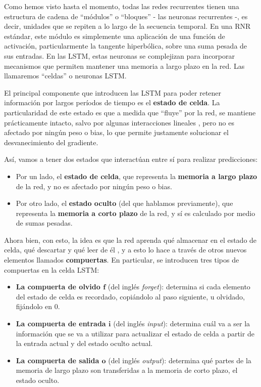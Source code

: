 \documentclass[../../main.tex]{subfiles}
\begin{document}
Como hemos visto hasta el momento, todas las redes recurrentes tienen una estructura de
cadena de ``módulos'' o ``bloques'' \cite{colahs-blog-lstm-2015} - las neuronas
recurrentes -, es decir, unidades que se repiten a lo largo de la secuencia temporal. En
una RNR estándar, este módulo es simplemente una aplicación de una función de activación,
particularmente la tangente hiperbólica, sobre una suma pesada de sus entradas. En las
LSTM, estas neuronas se complejizan para incorporar mecanismos que permiten mantener
una memoria a largo plazo en la red. Las llamaremos ``celdas'' o neuronas LSTM.

El principal componente que introducen las LSTM para poder retener información por largos
períodos de tiempo es el \textbf{estado de celda}. La particularidad de este estado es que
a medida que ``fluye'' por la red, se mantiene prácticamente intacto, salvo por algunas
interacciones lineales \cite{colahs-blog-lstm-2015}, pero no es afectado por ningún peso o
bias, lo que permite justamente solucionar el desvanecimiento del gradiente.

Así, vamos a tener dos estados que interactúan entre sí para realizar predicciones:
\begin{itemize}
    \item Por un lado, el \textbf{estado de celda}, que representa la \textbf{memoria a largo
    plazo} de la red, y no es afectado por ningún peso o bias.
    \item Por otro lado, el \textbf{estado oculto} (del que hablamos previamente), que
    representa la \textbf{memoria a corto plazo} de la red, y sí es calculado por medio
    de sumas pesadas.
\end{itemize}

Ahora bien, con esto, la idea es que la red aprenda qué almacenar en el estado de celda,
qué descartar y qué leer de él \cite{hands-on-ML-sklearn-tf}, y a esto lo hace a través de
otros nuevos elementos llamados \textbf{compuertas}. En particular, se introducen tres
tipos de compuertas en la celda LSTM:
\begin{itemize}
    \item \textbf{La compuerta de olvido \(\bm{f}\)} (del inglés \textit{forget}):
    determina si cada elemento del estado de celda es recordado, copiándolo al paso
    siguiente, u olvidado, fijándolo en 0.
    \item \textbf{La compuerta de entrada \(\bm{i}\)} (del inglés \textit{input}):
    determina cuál va a ser la información que se va a utilizar para actualizar
    el estado de celda a partir de la entrada actual y del estado oculto actual.
    \item \textbf{La compuerta de salida \(\bm{o}\)} (del inglés \textit{output}):
    determina qué partes de la memoria de largo plazo son transferidas a la memoria
    de corto plazo, el estado oculto.
\end{itemize}
\end{document}
